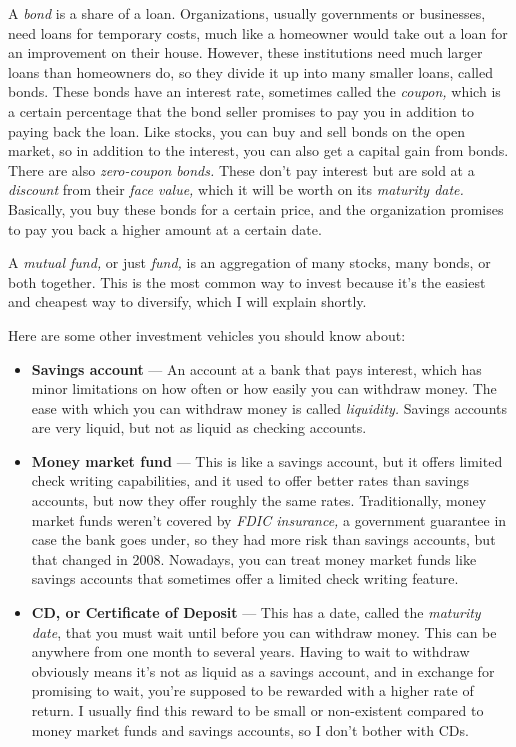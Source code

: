 A \emph{bond} is a share of a loan. Organizations, usually governments or businesses, need loans for temporary costs, much like a homeowner would take out a loan for an improvement on their house. However, these institutions need much larger loans than homeowners do, so they divide it up into many smaller loans, called bonds. These bonds have an interest rate, sometimes called the \emph{coupon,} which is a certain percentage that the bond seller promises to pay you in addition to paying back the loan. Like stocks, you can buy and sell bonds on the open market, so in addition to the interest, you can also get a capital gain from bonds. There are also \emph{zero-coupon bonds.} These don't pay interest but are sold at a \emph{discount} from their \emph{face value,} which it will be worth on its \emph{maturity date.} Basically, you buy these bonds for a certain price, and the organization promises to pay you back a higher amount at a certain date.

A \emph{mutual fund,} or just \emph{fund,} is an aggregation of many stocks, many bonds, or both together. This is the most common way to invest because it's the easiest and cheapest way to diversify, which I will explain shortly.

Here are some other investment vehicles you should know about:
\begin{itemize}
\item \textbf{Savings account} --- An account at a bank that pays interest, which has minor limitations on how often or how easily you can withdraw money. The ease with which you can withdraw money is called \emph{liquidity.} Savings accounts are very liquid, but not as liquid as checking accounts.

\item \textbf{Money market fund} --- This is like a savings account, but it offers limited check writing capabilities, and it used to offer better rates than savings accounts, but now they offer roughly the same rates. Traditionally, money market funds weren't covered by \emph{FDIC insurance,} a government guarantee in case the bank goes under, so they had more risk than savings accounts, but that changed in 2008. Nowadays, you can treat money market funds like savings accounts that sometimes offer a limited check writing feature.

\item \textbf{CD, or Certificate of Deposit} --- This has a date, called the \emph{maturity date}, that you must wait until before you can withdraw money. This can be anywhere from one month to several years. Having to wait to withdraw obviously means it's not as liquid as a savings account, and in exchange for promising to wait, you're supposed to be rewarded with a higher rate of return. I usually find this reward to be small or non-existent compared to money market funds and savings accounts, so I don't bother with CDs.
\end{itemize}

